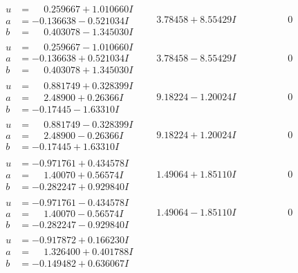 \documentclass[1p]{elsarticle_modified}
\theoremstyle{definition}
\begin{document}
$$\begin{array}{c|c|c}
\begin{aligned}
u &= \phantom{-}0.259667 + 1.010660 I \\
a &= -0.136638 - 0.521034 I \\
b &= \phantom{-}0.403078 - 1.345030 I\end{aligned}
 & \phantom{-}3.78458 + 8.55429 I & \phantom{-0.000000 } 0 \\ \hline\begin{aligned}
u &= \phantom{-}0.259667 - 1.010660 I \\
a &= -0.136638 + 0.521034 I \\
b &= \phantom{-}0.403078 + 1.345030 I\end{aligned}
 & \phantom{-}3.78458 - 8.55429 I & \phantom{-0.000000 } 0 \\ \hline\begin{aligned}
u &= \phantom{-}0.881749 + 0.328399 I \\
a &= \phantom{-}2.48900 + 0.26366 I \\
b &= -0.17445 - 1.63310 I\end{aligned}
 & \phantom{-}9.18224 - 1.20024 I & \phantom{-0.000000 } 0 \\ \hline\begin{aligned}
u &= \phantom{-}0.881749 - 0.328399 I \\
a &= \phantom{-}2.48900 - 0.26366 I \\
b &= -0.17445 + 1.63310 I\end{aligned}
 & \phantom{-}9.18224 + 1.20024 I & \phantom{-0.000000 } 0 \\ \hline\begin{aligned}
u &= -0.971761 + 0.434578 I \\
a &= \phantom{-}1.40070 + 0.56574 I \\
b &= -0.282247 + 0.929840 I\end{aligned}
 & \phantom{-}1.49064 + 1.85110 I & \phantom{-0.000000 } 0 \\ \hline\begin{aligned}
u &= -0.971761 - 0.434578 I \\
a &= \phantom{-}1.40070 - 0.56574 I \\
b &= -0.282247 - 0.929840 I\end{aligned}
 & \phantom{-}1.49064 - 1.85110 I & \phantom{-0.000000 } 0 \\ \hline\begin{aligned}
u &= -0.917872 + 0.166230 I \\
a &= \phantom{-}1.326400 + 0.401788 I \\
b &= -0.149482 + 0.636067 I\end{aligned}

\end{array}$$
\end{document}
